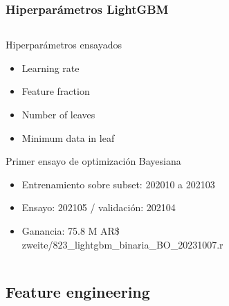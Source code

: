 \documentclass[aspectratio=169]{beamer} %
\begin{document}
\begin{frame}
  \frametitle{Hiperparámetros LightGBM}
  \begin{columns}[onlytextwidth]
    \begin{column}{.6\textwidth}
      \begin{block}{Hiperparámetros ensayados}
        \begin{itemize}
          \item Learning rate
          \item Feature fraction
          \item Number of leaves
          \item Minimum data in leaf
        \end{itemize}
      \end{block}
      \begin{block}{Primer ensayo de optimización Bayesiana}
       \begin{itemize}
          \item Entrenamiento sobre subset: 202010 a 202103
          \item Ensayo: 202105 / validación: 202104
          \item Ganancia: 75.8 M AR\$\\
            {\tiny zweite/823\_lightgbm\_binaria\_BO\_20231007.r}
		    \end{itemize}
      \end{block}
    \end{column}
  \end{columns}
\end{frame}





\subsection{Feature engineering}
\end{document}
